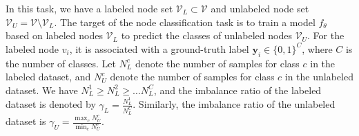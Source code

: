  In this task, we have a labeled node set $\mathcal{V}_L\subset\mathcal{V}$ and unlabeled node set $\mathcal{V}_U=\mathcal{V}\setminus\mathcal{V}_L$. The target of the node classification task is to train a model $f_\theta$ based on labeled nodes $\mathcal{V}_L$ to predict the classes of unlabeled nodes $\mathcal{V}_U$. For the labeled node $v_i$, it is associated with a ground-truth label $\mathbf{y}_i\in\{0,1\}^C$, where $C$ is the number of classes. Let $N_L^c$ denote the number of samples for class $c$ in the labeled dataset, and $N_U^c$ denote the number of samples for class $c$ in the unlabeled dataset. We have $N_L^1\geq N_L^2\geq\ldots N_L^C$, and the imbalance ratio of the labeled dataset is denoted by $\gamma_L=\frac{N_L^1}{N_L^C}$. Similarly, the imbalance ratio of the unlabeled dataset is $\gamma_U=\frac{\max_c N_U^c}{\min_c N_U^c}$.